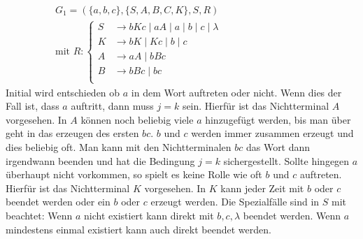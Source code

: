 \begin{align*}
	G_1=(\{a,b,c\},\{S,A,B,C, K\},S,R)&&&&&&&&&&&\\
	\text{mit }R:
	\begin{cases}
		S&\rightarrow bKc\mid aA\mid a\mid b\mid c\mid\lambda\\
		K&\rightarrow bK\mid Kc\mid b\mid c\\
		A&\rightarrow aA\mid bBc\\
		B&\rightarrow bBc\mid bc \\
	\end{cases}
\end{align*}
Initial wird entschieden ob $a$ in dem Wort auftreten oder nicht. Wenn dies der Fall ist, dass $a$ auftritt, dann muss $j=k$ sein. Hierfür ist das Nichtterminal $A$ vorgesehen. In $A$ können noch beliebig viele $a$ hinzugefügt werden, bis man über geht in das erzeugen des ersten $bc$. $b$ und $c$ werden immer zusammen erzeugt und dies beliebig oft. Man kann mit den Nichtterminalen $bc$ das Wort dann irgendwann beenden und hat die Bedingung $j=k$ sichergestellt. Sollte hingegen $a$ überhaupt nicht vorkommen, so spielt es keine Rolle wie oft $b$ und $c$ auftreten. Hierfür ist das Nichtterminal $K$ vorgesehen. In $K$ kann jeder Zeit mit $b$ oder $c$ beendet werden oder ein $b$ oder $c$ erzeugt werden. Die Spezialfälle sind in $S$ mit beachtet: Wenn $a$ nicht existiert kann direkt mit $b,c,\lambda$ beendet werden. Wenn $a$ mindestens einmal existiert kann auch direkt beendet werden.